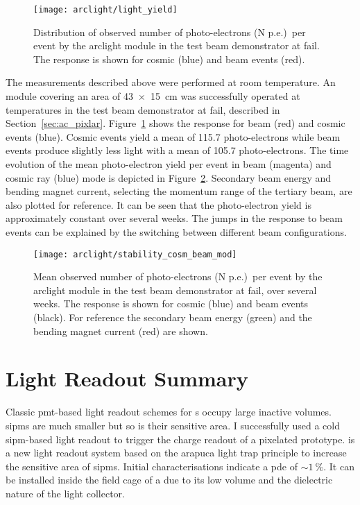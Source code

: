 \begin{figure}[tbp]
	\centering
	\texttt{[image: arclight/light\_yield]}
	\caption[\pixlar{}  response]{%
		Distribution of observed number of photo-electrons (N p.e.)\ per event by the \acrshort{arclight} module in the \pixlar{} test beam demonstrator at \acrshort{fail}.
		The response is shown for cosmic (blue) and beam events (red).
	}
	\label{fig:arclight_pixlar_response}
\end{figure}

The measurements described above were performed at room temperature.
An \AL{} module covering an area of \SI{43 x 15}{\centi\metre} was successfully operated at \lar{} temperatures in the \pixlar{} test beam demonstrator at \gls{fail}, described in Section~\ref{sec:ac_pixlar}.
Figure~\ref{fig:arclight_pixlar_response} shows the response for beam (red) and cosmic events (blue).
Cosmic events yield a mean of \num{115.7} photo-electrons while beam events produce slightly less light with a mean of \num{105.7} photo-electrons.
The time evolution of the mean photo-electron yield per event in beam (magenta) and cosmic ray (blue) mode is depicted in Figure~\ref{fig:arclight_pixlar_stability}.
Secondary beam energy and bending magnet current, selecting the momentum range of the tertiary beam, are also plotted for reference.
It can be seen that the photo-electron yield is approximately constant over several weeks.
The jumps in the response to beam events can be explained by the switching between different beam configurations.

\begin{figure}[tbp]
	\centering
	\texttt{[image: arclight/stability\_cosm\_beam\_mod]}
	\caption[\pixlar{}  response stability]{%
		Mean observed number of photo-electrons (N p.e.)\ per event by the \acrshort{arclight} module in the \pixlar{} test beam demonstrator at \acrshort{fail}, over several weeks.
		The response is shown for cosmic (blue) and beam events (black).
		For reference the secondary beam energy (green) and the bending magnet current (red) are shown.
	}
	\label{fig:arclight_pixlar_stability}
\end{figure}


\section{Light Readout Summary}
\label{sec:studies_light-col-summary}

Classic \gls{pmt}-based light readout schemes for \lartpc{}s occupy large inactive volumes.
\glspl{sipm} are much smaller but so is their sensitive area.
I successfully used a cold \gls{sipm}-based light readout to trigger the charge readout of a pixelated \lartpc{} prototype.
\AL{} is a new light readout system based on the \gls{arapuca} light trap principle to increase the sensitive area of \glspl{sipm}.
Initial characterisations indicate a \gls{pde} of $\sim{\SI{1}{\percent}}$.
It can be installed inside the field cage of a \lartpc{} due to its low volume and the dielectric nature of the light collector.